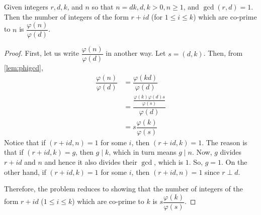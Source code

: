 	\begin{theorem} \label{thm:menon-lemma}
		Given integers $r,d, k$, and $n$ so that $n=dk, d, k>0,n\geq1$, and $\gcd(r,d)=1$. Then the number of integers of the form $r+id$ (for $1 \leq i \leq k$) which are co-prime to $n$ is $\dfrac{\varphi(n)}{\varphi(d)}$.
	\end{theorem}

	\begin{proof}
		First, let us write $\dfrac{\varphi(n)}{\varphi(d)}$ in another way. Let $s = (d,k)$. Then, from \autoref{lem:phigcd},
			\begin{align*}
				\dfrac{\varphi(n)}{\varphi(d)} &= \dfrac{\varphi(kd)}{\varphi(d)}\\
						   &= \dfrac{\frac{\varphi(k) \varphi(d) s}{\varphi(s)}}{\varphi(d)}\\
						   &= s \dfrac{\varphi(k)}{\varphi(s)}
			\end{align*}
		Notice that if $(r+id , n)=1$ for some $i$, then $(r+id , k) = 1$. The reason is that if $(r+id , k) = g$, then $g \mid  k$, which in turn means $g\mid n$. Now, $g$ divides $r+id$ and $n$ and hence it also divides their $\gcd$, which is $1$. So, $g=1$. On the other hand, if $(r+id, k)=1$ for some $i$, then $(r+id, n)=1$ since $r \perp d$.

		Therefore, the problem reduces to showing that the number of integers of the form $r+id$ ($1 \leq i \leq k$) which are co-prime to $k$ is $s \dfrac{\varphi(k)}{\varphi(s)}$.


\end{proof}
